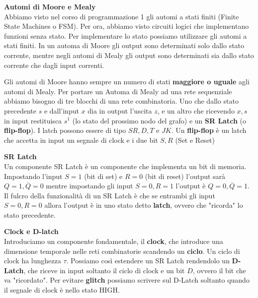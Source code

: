 \begin{defn}
	\textbf{Automi di Moore e Mealy} \\
	Abbiamo visto nel corso di programmazione 1 gli automi a stati finiti
	(Finite State Machines o FSM). Per ora, abbiamo visto circuiti logici che
	implementano funzioni senza stato. Per implementare lo stato possiamo
	utilizzare gli automi a stati finiti. In un automa di Moore gli output sono
	determinati solo dallo stato corrente, mentre negli automi di Mealy gli
	output sono determinati sia dallo stato corrente che dagli input correnti.
	
	
	Gli automi di Moore hanno sempre un numero di stati \textbf{maggiore o
	uguale} agli automi di Mealy. Per portare un Automa di Mealy ad una rete
	sequenziale abbiamo bisogno di tre blocchi di una rete combinatoria. Uno che
	dallo stato precedente $ s $ e dall'input $ x $ dia in output l'uscita $ z
	$, e un altro che ricevendo $ x,s $ in input restituisca $ s^1 $ (lo stato
	del prossimo nodo del grafo) e un \textbf{SR Latch} (o \textbf{flip-flop}).
	I latch possono essere di tipo $ SR, D, T $ e $ JK $. Un \textbf{flip-flop}
	è un latch che accetta in input un segnale di clock e i due bit $ S,R $ (Set
	e Reset)
\end{defn}

\begin{defn}
	\textbf{SR Latch} \\

	Un componente SR Latch è un componente che implementa un bit di memoria.
	Impostando l'input $ S=1 $ (bit di set) e $ R=0 $  (bit di reset) l'output
	sarà $ Q=1,\overbar{Q}=0 $ mentre impostando gli input $ S=0,R=1 $ l'output
	è $ Q=0,\overbar{Q}=1 $. Il fulcro della funzionalità di un SR Latch è che
	se entrambi gli input $ S=0,R=0 $ allora l'output è in uno stato detto
	\textbf{latch}, ovvero che "ricorda" lo stato precedente.
	
\end{defn}

\begin{defn}
	\textbf{Clock e D-latch} \\


	Introduciamo un componente fondamentale, il \textbf{clock}, che introduce
	una dimensione temporale nelle reti combinatorie scandendo un
	\textbf{ciclo}. Un ciclo di clock ha lunghezza $ \tau $. Possiamo così
	estendere un SR Latch rendendolo un \textbf{D-Latch}, che riceve in input
	soltanto il ciclo di clock e un bit $ D $, ovvero il bit che va "ricordato".
	Per evitare \textbf{glitch} possiamo scrivere sul D-Latch soltanto quando il
	segnale di clock è nello stato HIGH.

\end{defn}

